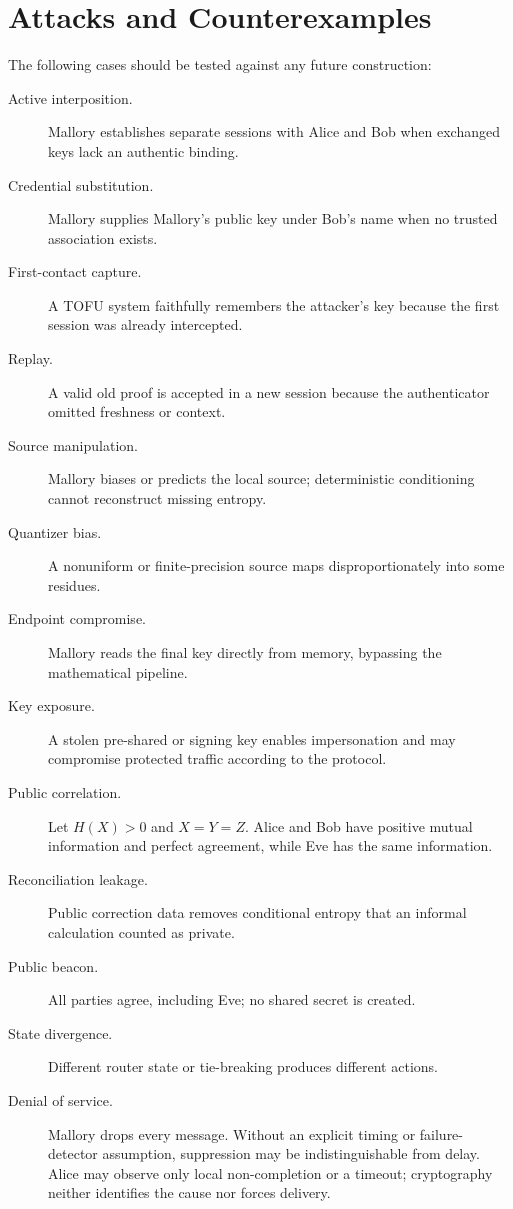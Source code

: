 \section{Attacks and Counterexamples}

The following cases should be tested against any future construction:

\begin{description}
    \item[Active interposition.] Mallory establishes separate sessions with
    Alice and Bob when exchanged keys lack an authentic binding.
    \item[Credential substitution.] Mallory supplies Mallory's public key under
    Bob's name when no trusted association exists.
    \item[First-contact capture.] A TOFU system faithfully remembers the
    attacker's key because the first session was already intercepted.
    \item[Replay.] A valid old proof is accepted in a new session because the
    authenticator omitted freshness or context.
    \item[Source manipulation.] Mallory biases or predicts the local source;
    deterministic conditioning cannot reconstruct missing entropy.
    \item[Quantizer bias.] A nonuniform or finite-precision source maps
    disproportionately into some residues.
    \item[Endpoint compromise.] Mallory reads the final key directly from
    memory, bypassing the mathematical pipeline.
    \item[Key exposure.] A stolen pre-shared or signing key enables
    impersonation and may compromise protected traffic according to the
    protocol.
    \item[Public correlation.] Let $H(X)>0$ and $X=Y=Z$.  Alice and Bob have
    positive mutual information and perfect agreement, while Eve has the same
    information.
    \item[Reconciliation leakage.] Public correction data removes conditional
    entropy that an informal calculation counted as private.
    \item[Public beacon.] All parties agree, including Eve; no shared secret is
    created.
    \item[State divergence.] Different router state or tie-breaking produces
    different actions.
    \item[Denial of service.] Mallory drops every message.  Without an explicit
    timing or failure-detector assumption, suppression may be indistinguishable
    from delay.  Alice may observe only local non-completion or a timeout;
    cryptography neither identifies the cause nor forces delivery.
\end{description}

